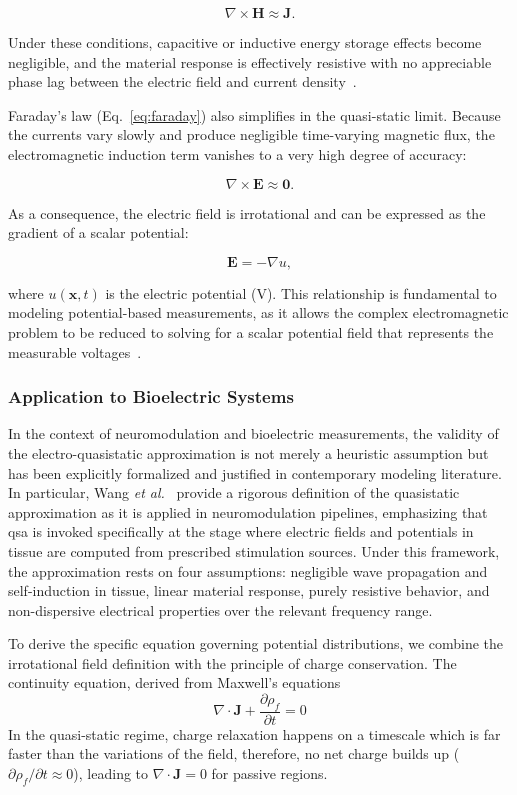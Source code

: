 \[
\nabla \times \mathbf{H} \approx \mathbf{J}.
\]

Under these conditions, capacitive or inductive energy storage effects become negligible, and the material response is effectively resistive with no appreciable phase lag between the electric field and current density~\cite{haus-melcher-1989}.

Faraday's law (Eq.~\ref{eq:faraday}) also simplifies in the quasi-static limit. Because the currents vary slowly and produce negligible time-varying magnetic flux, the electromagnetic induction term vanishes to a very high degree of accuracy:

\[
\nabla \times \mathbf{E} \approx \mathbf{0}.
\]

As a consequence, the electric field is irrotational and can be expressed as the gradient of a scalar potential:

\[
\mathbf{E} = -\nabla u,
\]

where $u(\mathbf{x},t)$ is the electric potential (V). This relationship is fundamental to modeling potential-based measurements, as it allows the complex electromagnetic problem to be reduced to solving for a scalar potential field that represents the measurable voltages~\cite{plonsey-1967,jackson-1999}.

\subsubsection{Application to Bioelectric Systems}
In the context of neuromodulation and bioelectric measurements, the validity of the electro-quasistatic approximation is not merely a heuristic assumption
but has been explicitly formalized and justified in contemporary modeling literature. In particular, Wang \emph{et al.}~\cite{wang-2024}
provide a rigorous definition of the quasistatic approximation as it is applied in neuromodulation pipelines, emphasizing that \gls{qsa} is invoked
specifically at the stage where electric fields and potentials in tissue are computed from prescribed stimulation sources. Under this framework,
the approximation rests on four assumptions: negligible wave propagation and self-induction in tissue, linear material response, purely resistive behavior,
 and non-dispersive electrical properties over the relevant frequency range.

To derive the specific equation governing potential distributions, we combine the irrotational field definition with the principle of charge conservation.
The continuity equation, derived from Maxwell’s equations
$$\nabla \cdot \mathbf{J} + \frac{\partial \rho_f}{\partial t} = 0$$
In the quasi-static regime, charge relaxation happens on a timescale which is far faster than the variations of the field, therefore, no net charge builds up ($\partial \rho_f / \partial t \approx 0$), leading to $\nabla \cdot \mathbf{J} = 0$ for passive regions.

